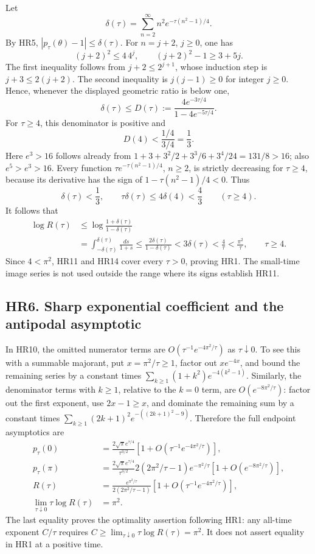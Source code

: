 \documentclass[11pt]{article}
\begin{document}
Let
\[
 \delta(\tau)=\sum_{n=2}^{\infty}n^2e^{-\tau(n^2-1)/4}.
                                                               \tag{HR12}
\]
By HR5, \(|p_\tau(\theta)-1|\le\delta(\tau)\). For \(n=j+2\),
\(j\ge0\), one has
\[
 (j+2)^2\le4\,4^j,\qquad (j+2)^2-1\ge3+5j.
\]
The first inequality follows from \(j+2\le2^{j+1}\), whose
induction step is \(j+3\le2(j+2)\). The second inequality is
\(j(j-1)\ge0\) for integer \(j\ge0\). Hence, whenever the
displayed geometric ratio is below one,
\[
 \delta(\tau)\le
 D(\tau):=\frac{4e^{-3\tau/4}}{1-4e^{-5\tau/4}}.              \tag{HR13}
\]
For \(\tau\ge4\), this denominator is positive and
\[
 D(4)<\frac{1/4}{3/4}=\frac13.
\]
Here \(e^3>16\) follows already from
\(1+3+3^2/2+3^3/6+3^4/24=131/8>16\); also \(e^5>e^3>16\).
Every function \(\tau e^{-\tau(n^2-1)/4}\), \(n\ge2\), is
strictly decreasing for \(\tau\ge4\), because its derivative has
the sign of \(1-\tau(n^2-1)/4<0\). Thus
\[
 \delta(\tau)<\frac13,\qquad
 \tau\delta(\tau)\le4\delta(4)<\frac43\qquad(\tau\ge4).
\]
It follows that
\[
 \begin{aligned}
 \log R(\tau)
 &\le\log\frac{1+\delta(\tau)}{1-\delta(\tau)}\\
 &=\int_{-\delta(\tau)}^{\delta(\tau)}\frac{ds}{1+s}
 \le\frac{2\delta(\tau)}{1-\delta(\tau)}
 <3\delta(\tau)<\frac4\tau<\frac{\pi^2}\tau,
 \qquad \tau\ge4.
 \end{aligned}
\tag{HR14}
\]
Since \(4<\pi^2\), HR11 and HR14 cover every \(\tau>0\),
proving HR1. The small-time image series is not used outside
the range where its signs establish HR11.

\subsection*{HR6. Sharp exponential coefficient and the antipodal asymptotic}

In HR10, the omitted numerator terms are
\(O(\tau^{-1}e^{-4\pi^2/\tau})\) as \(\tau\downarrow0\).
To see this with a summable majorant, put \(x=\pi^2/\tau\ge1\),
factor out \(xe^{-4x}\), and bound the remaining series by a
constant times \(\sum_{k\ge1}(1+k^2)e^{-4(k^2-1)}\).
Similarly, the denominator terms with \(k\ge1\), relative to
the \(k=0\) term, are \(O(e^{-8\pi^2/\tau})\): factor out the
first exponent, use \(2x-1\ge x\), and dominate the remaining
sum by a constant times
\(\sum_{k\ge1}(2k+1)^2e^{-((2k+1)^2-9)}\).
Therefore the full endpoint asymptotics are
\[
 \begin{aligned}
 p_\tau(0)&=\frac{2\sqrt\pi e^{\tau/4}}{\tau^{3/2}}
       [1+O(\tau^{-1}e^{-4\pi^2/\tau})],\\
 p_\tau(\pi)&=\frac{2\sqrt\pi e^{\tau/4}}{\tau^{3/2}}
       2(2\pi^2/\tau-1)e^{-\pi^2/\tau}
       [1+O(e^{-8\pi^2/\tau})],\\
 R(\tau)&=\frac{e^{\pi^2/\tau}}{2(2\pi^2/\tau-1)}
       [1+O(\tau^{-1}e^{-4\pi^2/\tau})],\\
 \lim_{\tau\downarrow0}\tau\log R(\tau)&=\pi^2.
 \end{aligned}                                                  \tag{HR15}
\]
The last equality proves the optimality assertion following HR1:
any all-time exponent \(C/\tau\) requires
\(C\ge\lim_{\tau\downarrow0}\tau\log R(\tau)=\pi^2\).
It does not assert equality in HR1 at a positive time.
\end{document}
